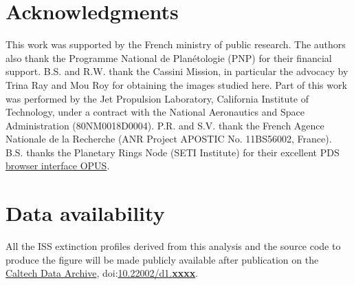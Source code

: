 \section*{Acknowledgments}

This work was supported by the French ministry of public research. The authors also thank the Programme National de Plan\'{e}tologie (PNP) for their financial support.
B.S. and R.W. thank the Cassini Mission, in particular the advocacy by Trina Ray and Mou Roy for obtaining the images studied here.
Part of this work was performed by the Jet Propulsion Laboratory, California Institute of Technology, under a contract with the National Aeronautics and Space Administration (80NM0018D0004).
P.R. and S.V. thank the French Agence Nationale de la Recherche (ANR Project APOSTIC No. 11BS56002, France).
B.S. thanks the Planetary Rings Node (SETI Institute) for their excellent PDS \href{https://tools.pds-rings.seti.org/opus}{browser interface OPUS}.

\section*{Data availability}
All the ISS extinction profiles derived from this analysis and the source code to produce the figure will be made
publicly available after publication on the \href{https://data.caltech.edu}{Caltech Data Archive},
doi:\href{https://doi.org/10.22002/d1.xxxx}{10.22002/d1.\textbf{xxxx}}.
